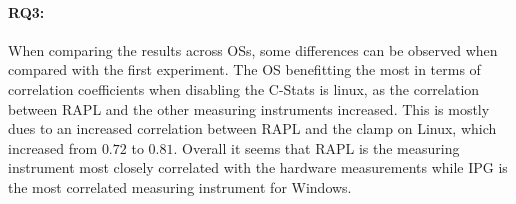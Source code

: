 \paragraph{RQ3:} When comparing the results across OSs, some differences can be observed when compared with the first experiment. The OS benefitting the most in terms of correlation coefficients when disabling the C-Stats is linux, as the correlation between RAPL and the other measuring instruments increased. This is mostly dues to an increased correlation between RAPL and the clamp on Linux, which increased from $0.72$ to $0.81$.  Overall it seems that RAPL is the measuring instrument most closely correlated with the hardware measurements while IPG is the most correlated measuring instrument for Windows.





%  


% 

% 


